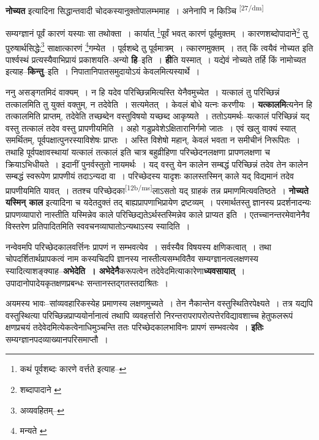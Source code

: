\documentclass[article,12pt,a4paper]{memoir}
\begin{document}
	  \pstart \textbf{नोच्यत} इत्यादिना सिद्धान्तवादी चोदकस्यानुक्तोपालम्भमाह । अनेनापि न किञ्चि \leavevmode\textsuperscript{\rmlatinfont\tiny [27/dm]} 
	  
	सम्यग्ज्ञानं पूर्वं कारणं यस्याः सा तथोक्ता । कार्यात् \footnote{कथं पूर्वशब्दः कारणे वर्त्तते इत्याह--\cite{dp-msD-n}}पूर्वं भवत् कारणं पूर्वमुक्तम् । कारणशब्दोपादाने\footnote{शब्दापादाने \cite{dp-msA} \cite{dp-msB}} तु पुरुषार्थसिद्धेः\footnote{अव्यवहितम्--\cite{dp-msD-n}} साक्षात्कारणं \footnote{मन्यते \cite{dp-msA} \cite{dp-edH}}गम्येत । पूर्वशब्दे तु पूर्वमात्रम् । त्कारणमुक्तम् । तत् किं त्वयैवं नोच्यत इति पार्श्वस्थं प्रत्यस्यैवाभिप्रायं प्रकाशयति--अन्यो \textbf{हि}--इति । \textbf{ही}ति यस्मात् । यद्येवं नोच्यते तर्हि किं नामोच्यत इत्याह--\textbf{किन्तु}--इति । निपातानिपातसमुदायोऽयं केवलमित्यस्यार्थे ।
	\pend
      

	  \pstart ननु असङ्गतमिदं वाक्यम् । न हि यदेव परिच्छिन्नमित्यस्ति येनैवमुच्येत । यत्कालं तु परिच्छिन्नं तत्कालमिति तु युक्तं वक्तुम्, न तदेवेति । सत्यमेतत् । केवलं बोधे यत्नः करणीयः । \textbf{यत्कालमि}त्यनेन हि तत्कालमिति प्राप्तम्, तदेवेति तच्छब्देन वस्तुविषयो यच्छब्द आकृष्यते । ततोऽयमर्थः--यत्कालं परिच्छिन्नं यद् वस्तु तत्कालं तदेव वस्तु प्रापणीयमिति । अहो गडुप्रवेशेऽक्षितारानिर्गमो जातः । एवं खलु वाक्यं स्यात् समर्थितम्, पूर्वपक्षात्पुनरस्याविशेषः प्राप्तः । अस्ति विशेषो महान्, केवलं भवता न समीचीनं निरूपितः । तथाहि पूर्वपक्षावस्थायां यत्कालं तत्कालं इति चात्र बहुव्रीहिणा परिच्छेदनलक्षणा प्रापणलक्षणा च क्रियाऽभिधीयते । इदानीं पुनर्वस्तुतो नायमर्थः । यद् वस्तु येन कालेन सम्बद्धं परिच्छिन्नं तदेव तेन कालेन सम्बद्धं स्वरूपेण प्रापणीयं तदाऽन्यदा वा । परिच्छेदस्य यादृशः कालस्तस्मिन् काले यद् विद्यमानं तदेव प्रापणीयमिति यावत् । ततश्च परिच्छेदका\leavevmode\textsuperscript{\rmlatinfont\tiny [12b/ms]}लाऽसतो यद् ग्राहकं तन्न प्रमाणमित्यवतिष्ठते । \textbf{नोच्यते यस्मिन् काल} इत्यादिना च यदेतदुक्तं तद् बाह्यप्रापणाभिप्रायेण द्रष्टव्यम् । परमार्थतस्तु ज्ञानस्य प्रदर्शनादन्यः प्रापणव्यापारो नास्तीति यस्मिन्नेव काले परिच्छिद्यतेऽर्थस्तस्मिन्नेव काले प्राप्यत इति । एतच्चानन्तरमेवानेनैव विस्तरेण प्रतिपादितमिति स्ववचनव्याघातोऽन्यथाऽस्य स्यादिति ।
	\pend
      

	  \pstart नन्वेवमपि परिच्छेदकालवर्त्तिनः प्रापणं न सम्भवत्येव । सर्वस्यैव विषयस्य क्षणिकत्वात् । तथा चोपदर्शितार्थप्रापकत्वं नाम कस्यचिदपि ज्ञानस्य नास्तीत्यसम्भवितैव सम्यग्ज्ञानत्वलक्षणस्य स्यादित्याशङ्क्याह--\textbf{अभेदेति । अभेदेनै}करूपत्वेन तदेवेदमित्याकारेणा\textbf{ध्यवसायात्} । उपादानोपादेयकृतक्षणप्रबन्धः सन्तानस्तद्गतस्तदाश्रितः ।
	\pend
      

	  \pstart अयमस्य भावः--सांव्यवहारिकस्येह प्रमाणस्य लक्षणमुच्यते । तेन नैकान्तेन वस्तुस्थितिरपेक्ष्यते । तत्र यद्यपि वस्तुस्थित्या परिच्छिन्नप्राप्ययोर्नानात्वं तथापि व्यवहर्त्तारो निरन्तरापरापरोत्पत्तेरविद्यावशाच्च हेतुफलरूपं क्षणप्रचयं तदेवेदमित्येकत्वेनाधिमुञ्चन्ति ततः परिच्छेदकालभाविनः प्रापणं सम्भवत्येव । \textbf{इतिः} सम्यग्ज्ञानपदव्याख्यानपरिसमाप्तौ ।
	\pend
      
\end{document}
